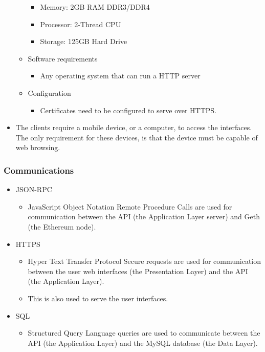 \documentclass{article}
\begin{document}
\begin{itemize}
\begin{itemize}
\begin{itemize}
\item Memory: 2GB RAM DDR3/DDR4
\item Processor: 2-Thread CPU
\item Storage: 125GB Hard Drive
\end{itemize} 
\item Software requirements
\begin{itemize}
\item Any operating system that can run a HTTP server
\end{itemize}
\item Configuration
\begin{itemize}
\item Certificates need to be configured to serve over HTTPS.
\end{itemize}
\end{itemize}
\item The clients require a mobile device, or a computer, to access the interfaces. The only requirement for these devices, is that the device must be capable of web browsing.
\end{itemize}

\subsubsection*{Communications}
\begin{itemize}
\item JSON-RPC
\begin{itemize}
\item JavaScript Object Notation Remote Procedure Calls are used for communication between the API (the Application Layer server) and Geth (the Ethereum node).
\end{itemize}

\item HTTPS
\begin{itemize}
\item Hyper Text Transfer Protocol Secure requests are used for communication between the user web interfaces (the Presentation Layer) and the API (the Application Layer).
\item This is also used to serve the user interfaces.
\end{itemize}

\item SQL
\begin{itemize}
\item Structured Query Language queries are used to communicate between the API (the Application Layer) and the MySQL database (the Data Layer).
\end{itemize}

\end{itemize}
\end{document}
